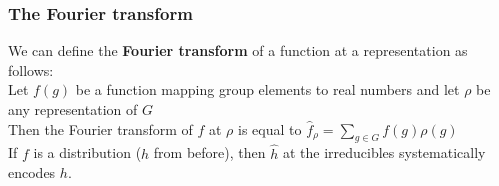\documentclass{beamer} %
\theoremstyle{definition} %
\def \pausenl {\pause $ \ $\\}
\begin{document}
\begin{frame}
	\frametitle{The Fourier transform}
	
	We can define the \textbf{Fourier transform} of a function at a representation as follows:\\
	\pausenl
	
	Let $f(g)$ be a function mapping group elements to real numbers and let $\rho$ be any representation of $G$\\
	
	\pausenl
	
	Then the Fourier transform of $f$ at $\rho$ is equal to $\hat{f}_\rho = \sum\limits_{g\in G}f(g)\rho(g)$\\
	
	\pausenl
	
	If $f$ is a distribution ($h$ from before), then $\hat{h}$ at the irreducibles systematically encodes $h$.
	
	
\end{frame}
\end{document}
